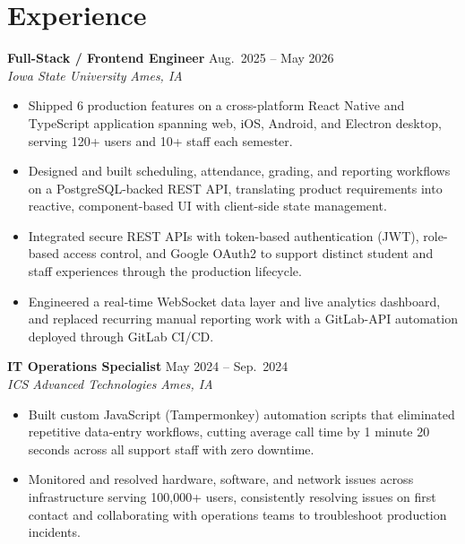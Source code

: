 \documentclass[letterpaper,10.5pt]{article}
\begin{document}
\section{Experience}

\textbf{Full-Stack / Frontend Engineer} \hfill Aug.\ 2025 -- May 2026 \\
\textit{Iowa State University} \hfill \textit{Ames, IA}
\begin{itemize}[leftmargin=0.2in, itemsep=0pt, topsep=3pt]
  \small
  \item Shipped 6 production features on a cross-platform React Native and TypeScript application spanning web, iOS, Android, and Electron desktop, serving 120+ users and 10+ staff each semester.
  \item Designed and built scheduling, attendance, grading, and reporting workflows on a PostgreSQL-backed REST API, translating product requirements into reactive, component-based UI with client-side state management.
  \item Integrated secure REST APIs with token-based authentication (JWT), role-based access control, and Google OAuth2 to support distinct student and staff experiences through the production lifecycle.
  \item Engineered a real-time WebSocket data layer and live analytics dashboard, and replaced recurring manual reporting work with a GitLab-API automation deployed through GitLab CI/CD.
\end{itemize}

\vspace{4pt}

\textbf{IT Operations Specialist} \hfill May 2024 -- Sep.\ 2024 \\
\textit{ICS Advanced Technologies} \hfill \textit{Ames, IA}
\begin{itemize}[leftmargin=0.2in, itemsep=0pt, topsep=3pt]
  \small
  \item Built custom JavaScript (Tampermonkey) automation scripts that eliminated repetitive data-entry workflows, cutting average call time by 1 minute 20 seconds across all support staff with zero downtime.
  \item Monitored and resolved hardware, software, and network issues across infrastructure serving 100,000+ users, consistently resolving issues on first contact and collaborating with operations teams to troubleshoot production incidents.
\end{itemize}

\end{document}
